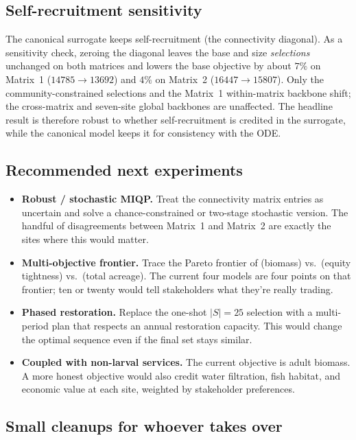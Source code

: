 \documentclass[11pt]{article}
\begin{document}
\subsection{Self-recruitment sensitivity}

The canonical surrogate keeps self-recruitment (the connectivity diagonal). As a sensitivity check, zeroing the diagonal leaves the base and size \emph{selections} unchanged on both matrices and lowers the base objective by about $7\%$ on Matrix~1 ($14785 \to 13692$) and $4\%$ on Matrix~2 ($16447 \to 15807$). Only the community-constrained selections and the Matrix~1 within-matrix backbone shift; the cross-matrix and seven-site global backbones are unaffected. The headline result is therefore robust to whether self-recruitment is credited in the surrogate, while the canonical model keeps it for consistency with the ODE.

\subsection{Recommended next experiments}

\begin{itemize}[leftmargin=1.4em, itemsep=0.2em]
  \item \textbf{Robust / stochastic MIQP.} Treat the connectivity matrix entries as uncertain and solve a chance-constrained or two-stage stochastic version. The handful of disagreements between Matrix~1 and Matrix~2 are exactly the sites where this would matter.
  \item \textbf{Multi-objective frontier.} Trace the Pareto frontier of (biomass) vs.\ (equity tightness) vs.\ (total acreage). The current four models are four points on that frontier; ten or twenty would tell stakeholders what they're really trading.
  \item \textbf{Phased restoration.} Replace the one-shot $|S|=25$ selection with a multi-period plan that respects an annual restoration capacity. This would change the optimal sequence even if the final set stays similar.
  \item \textbf{Coupled with non-larval services.} The current objective is adult biomass. A more honest objective would also credit water filtration, fish habitat, and economic value at each site, weighted by stakeholder preferences.
\end{itemize}

\subsection{Small cleanups for whoever takes over}
\end{document}
